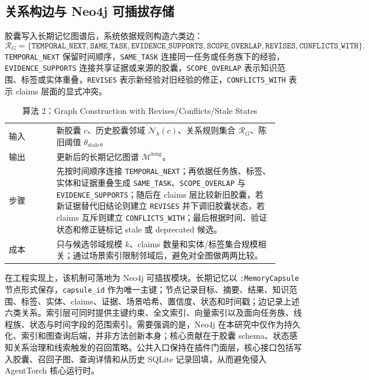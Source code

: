 \documentclass[a4paper,fleqn]{cas-sc}
\begin{document}
\begin{CJK*}{UTF8}{gbsn}
\subsection{关系构边与 Neo4j 可插拔存储}

胶囊写入长期记忆图谱后，系统依据规则构造六类边：
\begin{equation}
\mathcal{R}_{G}=\{
\texttt{TEMPORAL\_NEXT},
\texttt{SAME\_TASK},
\texttt{EVIDENCE\_SUPPORTS},
\texttt{SCOPE\_OVERLAP},
\texttt{REVISES},
\texttt{CONFLICTS\_WITH}
\}.
\end{equation}
\texttt{TEMPORAL\_NEXT} 保留时间顺序，\texttt{SAME\_TASK} 连接同一任务或任务族下的经验，\texttt{EVIDENCE\_SUPPORTS} 连接共享证据或来源的胶囊，\texttt{SCOPE\_OVERLAP} 表示知识范围、标签或实体重叠，\texttt{REVISES} 表示新经验对旧经验的修正，\texttt{CONFLICTS\_WITH} 表示 claims 层面的显式冲突。

\begin{table}[t]
\centering
\scriptsize
\caption{算法 2：Graph Construction with Revises/Conflicts/Stale States}
\label{alg:graph-construction}
\setlength{\tabcolsep}{4pt}
\begin{tabular}{P{0.16\linewidth}P{0.75\linewidth}}
\toprule
输入 & 新胶囊 $c$、历史胶囊邻域 $\mathcal{N}_k(c)$、关系规则集合 $\mathcal{R}_{G}$、陈旧阈值 $\theta_{\text{stale}}$。 \\
输出 & 更新后的长期记忆图谱 $\mathcal{M}^{\text{long}}$。 \\
步骤 & 先按时间顺序连接 \texttt{TEMPORAL\_NEXT}；再依据任务族、标签、实体和证据重叠生成 \texttt{SAME\_TASK}、\texttt{SCOPE\_OVERLAP} 与 \texttt{EVIDENCE\_SUPPORTS}；随后在 claims 层比较新旧胶囊，若新证据替代旧结论则建立 \texttt{REVISES} 并下调旧胶囊状态，若 claims 互斥则建立 \texttt{CONFLICTS\_WITH}；最后根据时间、验证状态和修正链标记 stale 或 deprecated 候选。 \\
成本 & 只与候选邻域规模 $k$、claims 数量和实体/标签集合规模相关；通过场景索引限制邻域后，避免对全图做两两比较。 \\
\bottomrule
\end{tabular}
\end{table}

在工程实现上，该机制可落地为 Neo4j 可插拔模块。长期记忆以 \texttt{:MemoryCapsule} 节点形式保存，\texttt{capsule\_id} 作为唯一主键；节点记录目标、摘要、结果、知识范围、标签、实体、claims、证据、场景哈希、置信度、状态和时间戳；边记录上述六类关系。索引层可同时提供主键约束、全文索引、向量索引以及面向任务族、线程族、状态与时间字段的范围索引。需要强调的是，Neo4j 在本研究中仅作为持久化、索引和图查询后端，并非方法创新本身；核心贡献在于胶囊 schema、状态感知关系治理和线索触发的召回策略。公共入口保持在插件门面层，核心接口包括写入胶囊、召回子图、查询详情和从历史 SQLite 记录回填，从而避免侵入 AgentTorch 核心运行时。


\end{CJK*}
\end{document}
